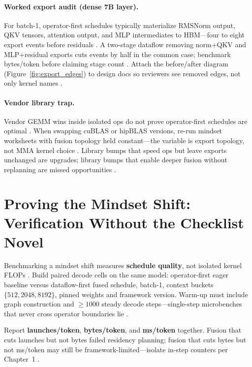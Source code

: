\paragraph{Worked export audit (dense 7B layer).}
For batch-1, operator-first schedules typically materialize RMSNorm output, QKV tensors, attention output, and MLP intermediates to HBM---four to eight export events before residuals \citep{memoryfloor2026,taxbreak2026}.
A two-stage dataflow removing norm+QKV and MLP+residual exports cuts events by half in the common case; benchmark bytes/token before claiming stage count \citep{yirage2026}.
Attach the before/after diagram (Figure~\ref{fig:export_edges}) to design docs so reviewers see removed edges, not only kernel names \citep{patel2025llminference}.

\paragraph{Vendor library trap.}
Vendor GEMM wins inside isolated ops do not prove operator-first schedules are optimal \citep{dlbook,patel2025llminference}.
When swapping cuBLAS or hipBLAS versions, re-run mindset worksheets with fusion topology held constant---the variable is export topology, not MMA kernel choice \citep{memoryfloor2026}.
Library bumps that speed ops but leave exports unchanged are upgrades; library bumps that enable deeper fusion without replanning are missed opportunities \citep{chen2020compilerbasedhardw}.

\section{Proving the Mindset Shift: Verification Without the Checklist Novel}
\label{sec:verification_method}

Benchmarking a mindset shift measures \textbf{schedule quality}, not isolated kernel FLOPs \citep{taxbreak2026,memoryfloor2026,patel2025llminference}.
Build paired decode cells on the same model: operator-first eager baseline versus dataflow-first fused schedule, batch-1, context buckets $\{512,2048,8192\}$, pinned weights and framework version.
Warm-up must include graph construction and ${\ge}1000$ steady decode steps---single-step microbenches that never cross operator boundaries lie \citep{patel2025llminference}.

Report \textbf{launches/token}, \textbf{bytes/token}, and \textbf{ms/token} together.
Fusion that cuts launches but not bytes failed residency planning; fusion that cuts bytes but not ms/token may still be framework-limited---isolate in-step counters per Chapter~1 \citep{memoryfloor2026,kwon2023vllm}.

